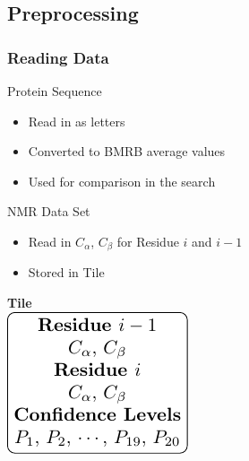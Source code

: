 \documentclass{beamer}
\begin{document}
\subsection{Preprocessing} 
\begin{frame}
	\frametitle{Reading Data}
	\begin{minipage}{0.45\textwidth}
		\begin{block}{Protein Sequence}
			\begin{itemize}
				\item Read in as letters
				\item Converted to BMRB average values
				\item Used for comparison in the search
			\end{itemize}
		\end{block}
		\begin{block}{NMR Data Set}
			\begin{itemize}
				\item Read in $C_{\alpha}$, $C_{\beta}$ for Residue $i$ and $i-1$
				\item Stored in Tile
			\end{itemize}
		\end{block}
	\end{minipage}
	\begin{minipage}{0.45\textwidth}
	\begin{center}
		\huge\textbf{Tile}\\
		\vspace {12pt}
		\includegraphics[width=\textwidth]{tile_fig}
	\end{center}
	\end{minipage}
\end{frame}
\end{document}

